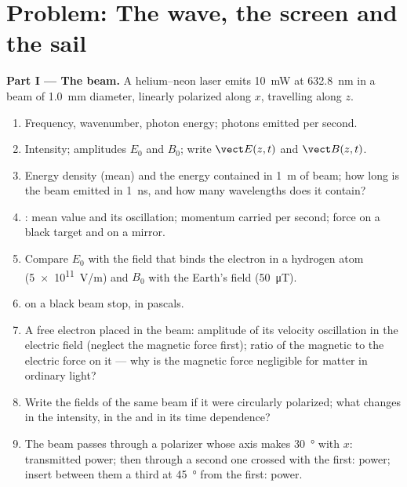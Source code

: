 \section{Problem: The wave, the screen and the sail}

\begin{problem}
\label{pb:b2:plane-waves-polarization:1}

\medskip
\noindent\textbf{Part I --- The beam.}
A helium--neon laser emits \qty{10}{mW} at \qty{632.8}{nm} in a beam of
\qty{1.0}{mm} diameter, linearly polarized along $x$, travelling along
$z$.
\begin{enumerate}
  \item Frequency, wavenumber, photon energy; photons emitted per
        second.
  \item Intensity; amplitudes $E_0$ and $B_0$; write $\vect E(z, t)$ and
        $\vect B(z, t)$.
  \item Energy density (mean) and the energy contained in \qty{1}{m} of
        beam; how long is the beam emitted in \qty{1}{ns}, and how many
        wavelengths does it contain?
  \item {}: mean value and its oscillation; momentum
        carried per second; force on a black target and on a mirror.
  \item Compare $E_0$ with the field that binds the electron in a
        hydrogen atom (\qty{5e11}{V/m}) and $B_0$ with the Earth's field
        (\qty{50}{\micro T}).
  \item {} on a black beam stop, in pascals.
  \item A free electron placed in the beam: amplitude of its velocity
        oscillation in the electric field (neglect the magnetic force
        first); ratio of the magnetic to the electric force on it ---
        why is the magnetic force negligible for matter in ordinary
        light?
  \item Write the fields of the same beam if it were circularly
        polarized; what changes in the intensity, in the  and in its time dependence?
  \item The beam passes through a polarizer whose axis makes
        \qty{30}{\degree} with $x$: transmitted power; then through a second
        one crossed with the first: power; insert between them a
        third at \qty{45}{\degree} from the first: power.
\end{enumerate}


\end{problem}
